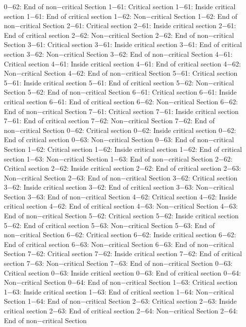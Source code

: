 0−62: End of non−critical Section
1−61: Critical section
1−61: Inside critical section
1−61: End of critical section
1−62: Non−critical Section
1−62: End of non−critical Section
2−61: Critical section
2−61: Inside critical section
2−61: End of critical section
2−62: Non−critical Section
2−62: End of non−critical Section
3−61: Critical section
3−61: Inside critical section
3−61: End of critical section
3−62: Non−critical Section
3−62: End of non−critical Section
4−61: Critical section
4−61: Inside critical section
4−61: End of critical section
4−62: Non−critical Section
4−62: End of non−critical Section
5−61: Critical section
5−61: Inside critical section
5−61: End of critical section
5−62: Non−critical Section
5−62: End of non−critical Section
6−61: Critical section
6−61: Inside critical section
6−61: End of critical section
6−62: Non−critical Section
6−62: End of non−critical Section
7−61: Critical section
7−61: Inside critical section
7−61: End of critical section
7−62: Non−critical Section
7−62: End of non−critical Section
0−62: Critical section
0−62: Inside critical section
0−62: End of critical section
0−63: Non−critical Section
0−63: End of non−critical Section
1−62: Critical section
1−62: Inside critical section
1−62: End of critical section
1−63: Non−critical Section
1−63: End of non−critical Section
2−62: Critical section
2−62: Inside critical section
2−62: End of critical section
2−63: Non−critical Section
2−63: End of non−critical Section
3−62: Critical section
3−62: Inside critical section
3−62: End of critical section
3−63: Non−critical Section
3−63: End of non−critical Section
4−62: Critical section
4−62: Inside critical section
4−62: End of critical section
4−63: Non−critical Section
4−63: End of non−critical Section
5−62: Critical section
5−62: Inside critical section
5−62: End of critical section
5−63: Non−critical Section
5−63: End of non−critical Section
6−62: Critical section
6−62: Inside critical section
6−62: End of critical section
6−63: Non−critical Section
6−63: End of non−critical Section
7−62: Critical section
7−62: Inside critical section
7−62: End of critical section
7−63: Non−critical Section
7−63: End of non−critical Section
0−63: Critical section
0−63: Inside critical section
0−63: End of critical section
0−64: Non−critical Section
0−64: End of non−critical Section
1−63: Critical section
1−63: Inside critical section
1−63: End of critical section
1−64: Non−critical Section
1−64: End of non−critical Section
2−63: Critical section
2−63: Inside critical section
2−63: End of critical section
2−64: Non−critical Section
2−64: End of non−critical Section
